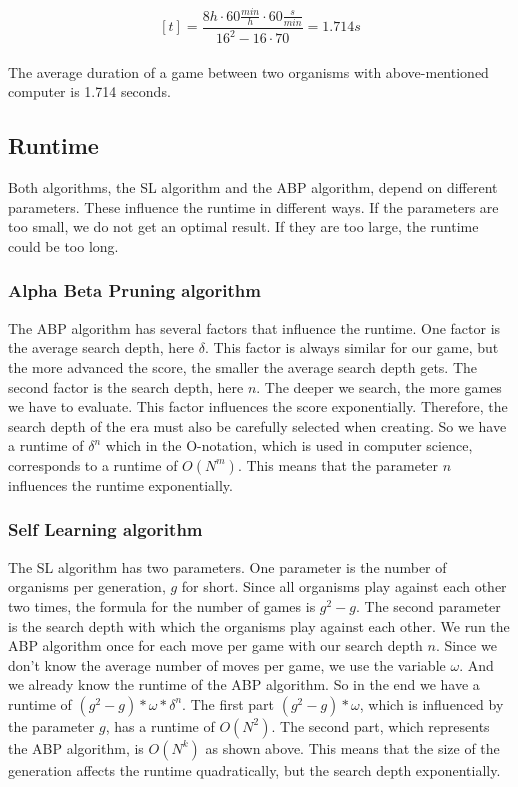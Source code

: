 $$ [t] =  \frac{8h \cdot 60\frac{min}{h} \cdot 60\frac{s}{min}}{16^2 - 16 \cdot 70} = 1.714s$$\\
The average duration of a game between two organisms with above-mentioned computer is 1.714 seconds.

\subsection{Runtime}
Both algorithms, the \ac{SL} algorithm and the \ac{ABP} algorithm, depend on different parameters. These influence the runtime in different ways. If the parameters are too small, we do not get an optimal result. If they are too large, the runtime could be too long.

\subsubsection{Alpha Beta Pruning algorithm}
The \ac{ABP} algorithm has several factors that influence the runtime. One factor is the average search depth, here $\delta$. This factor is always similar for our game, but the more advanced the score, the smaller the average  search depth gets. The second factor is the search depth, here $n$. The deeper we search, the more games we have to evaluate. This factor influences the score exponentially.  Therefore, the search depth of the era must also be carefully selected when creating. So we have a runtime of $\delta^n$ which in the O-notation, which is used in computer science, corresponds to a runtime of $O(N^{m})$. This means that the parameter $n$ influences the runtime exponentially.

\subsubsection{Self Learning algorithm}
The \ac{SL} algorithm has two parameters. One parameter is the number of organisms per generation, $g$ for short. Since all organisms play against each other two times, the formula for the number of games is $g^2 - g$.  The second parameter is the search depth with which the organisms play against each other. We run the \ac{ABP} algorithm once for each move per game with our search depth $n$. Since we don't know the average number of moves per game, we use the variable $\omega$.  And we already know the runtime of the \ac{ABP} algorithm. So in the end we have a runtime of $(g^2 - g) * \omega * \delta^n$. The first part $(g^2 - g) * \omega$, which is influenced by the parameter $g$, has a runtime of $O(N^2)$. The second part, which represents the \ac{ABP} algorithm, is $O(N^k)$ as shown above. This means that the size of the generation affects the runtime quadratically, but the search depth exponentially.

